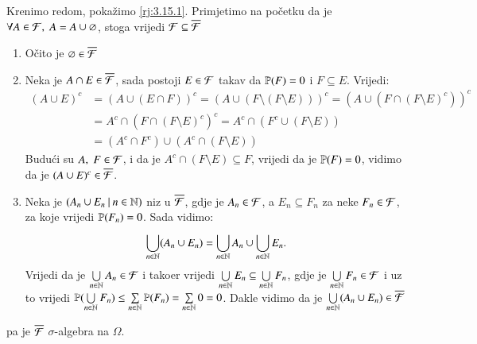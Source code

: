 \begin{rj}[\ref{zad:3.10}]
    Krenimo redom, poka\v zimo \ref{rj:3.15.1}.
    Primjetimo na po\v cetku da je $\forall A \in \mathcal{F}, \; A = A \cup \varnothing$, stoga vrijedi $\mathcal{F} \subseteq \overline{\mathcal{F}}$
    \begin{enumerate}[label=(\roman*)]
        \item O\v cito je $\varnothing \in \overline{\mathcal{F}}$
        \item Neka je $A \cap E \in \overline{\mathcal{F}}$, sada postoji $E \in \mathcal{F}$ takav da $\mathbb{P}({F}) = 0$ i $F \subseteq E$.
        Vrijedi:
        \begin{equation*}
            \begin{aligned}
                (A \cup E)^c &= (A \cup (E \cap F))^c = (A \cup (F \setminus (F \setminus E)))^c = (A \cup (F \cap (F \setminus E)^c))^c\\
                &= A^c \cap (F \cap (F \setminus E)^c)^c = A^c \cap (F^c \cup (F \setminus E))\\
                &= (A^c \cap F^c) \cup (A^c \cap (F \setminus E))
            \end{aligned}
        \end{equation*}
        Budu\' ci su $A, \; F \in \mathcal{F}$, i da je $A^c \cap (F \setminus E) \subseteq F$, vrijedi da je $\mathbb{P}({F}) = 0$, vidimo da je $(A \cup E)^c \in \overline{\mathcal{F}}$.
        \item Neka je $({A_n \cup E_n} \: | \: {n \in \mathbb{N}})$ niz u $\overline{\mathcal{F}}$, gdje je $A_n \in \mathcal{F}$, a $E_n \subseteq F_n$ za neke $F_n \in \mathcal{F}$, za koje vrijedi $\mathbb{P}({F_n}) = 0$.
        Sada vidimo:
        \begin{equation*}
            \bigcup\limits_{n \in \mathbb{N}}^{} (A_n \cup E_n) = \bigcup\limits_{n \in \mathbb{N}}^{} A_n \cup \bigcup\limits_{n \in \mathbb{N}}^{} E_n.
        \end{equation*}
        Vrijedi da je $\bigcup\limits_{n \in \mathbb{N}}^{} A_n \in \mathcal{F}$ i tako\dj er vrijedi $\bigcup\limits_{n \in \mathbb{N}}^{} E_n \subseteq \bigcup\limits_{n \in \mathbb{N}}^{} F_n$, gdje je $\bigcup\limits_{n \in \mathbb{N}}^{} F_n \in \mathcal{F}$ i uz to vrijedi $\mathbb{P}({\bigcup\limits_{n \in \mathbb{N}}^{} F_n}) \leq \sum\limits_{n \in \mathbb{N}}^{} \mathbb{P}({F_n}) = \sum\limits_{n \in \mathbb{N}}^{} 0 = 0$.
        Dakle vidimo da je $\bigcup\limits_{n \in \mathbb{N}}^{} (A_n \cup E_n) \in \overline{\mathcal{F}}$
    \end{enumerate}
    pa je $\overline{\mathcal{F}}$ $\sigma$-algebra na $\Omega$.


\end{rj}
